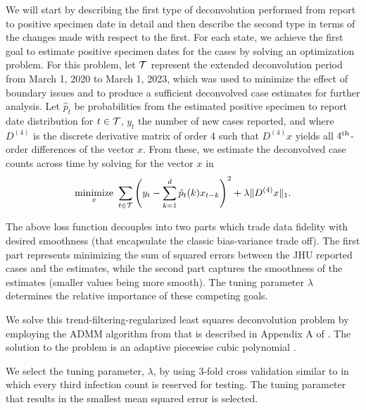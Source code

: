 \documentclass{article}
\begin{document}
We will start by describing the first type of deconvolution performed from report to positive specimen date in detail and
then describe the second type in terms of the changes made with respect to the first.
For each state, we achieve the first goal to estimate positive specimen dates for the cases by solving an optimization problem. 
For this problem, let $\mathcal{T}$ represent the extended deconvolution period from March 1, 2020 to March 1, 2023,
which was used to minimize the effect of boundary issues and to produce a sufficient deconvolved case estimates for further analysis.
Let $\hat{p}_t$ be probabilities from the estimated
positive specimen to report date distribution for $t \in \mathcal{T}$, $y_t$ the number of new cases
reported, and where $D^{(4)}$ is the discrete derivative matrix of order 4
such that $D^{(4)}x$ yields all $4^{\textnormal{th}}$-order differences of the vector $x$. From these,
we estimate the deconvolved case counts across time by solving for the vector $x$ in
\begin{align*}
\operatorname*{minimize}_{x}\ \sum_{t \in \mathcal{T}} \left ( y_t -  \sum_{k = 1}^{d} \hat{p}_t(k)x_{t-k} 
\right )^2 + \lambda \|D^{(4)}x\|_1. 
\end{align*}

The above loss function decouples into two parts which trade data fidelity with
desired smoothness (that
encapsulate the classic bias-variance trade off). The first part represents
minimizing the sum of squared errors between the JHU reported cases and the
estimates, while the second part captures the smoothness of the estimates
(smaller values being more smooth). The tuning parameter $\lambda$ determines
the relative importance of these competing goals.

We solve this trend-filtering-regularized least squares deconvolution problem by
employing the ADMM algorithm from \citet{ramdas2016fast} that is described in
Appendix A of \citet{jahja2022real}. The solution to the problem is an adaptive
piecewise cubic polynomial \citep{tibshirani2014adaptive,
tibshirani2022divided}.

We select the tuning parameter, $\lambda$, by using $3$-fold cross validation similar to
\citet{jahja2022real} in which every third infection count is
reserved for testing. The tuning parameter that results in the smallest mean squared error is selected.
\end{document}
